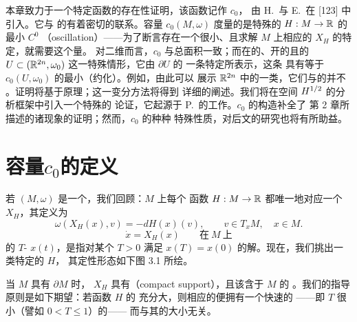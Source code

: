 
本章致力于一个特定\trCapacity{}函数的存在性证明，该函数记作 $c_{0}$，%
由 H.~\trHofer{}与 E.~\trZehnder{}在 [123] 中引入。它与\trHamiltonianSystem{}%
的\trPeriodicOrbit{}有着密切的联系。容量 $c_{0}(M,\omega)$ 度量的是特殊的%
\trHamiltonianFunction{} $H:M\to\mathbb{R}$ 的最小 $C^{0}$\textbf{\trOscillation}%
（oscillation）——为了断言存在一个\trPeriodic{}很小、且求解 $M$ 上相应的%
\trHamiltonianSystem{} $X_H$ 的特定\trPeriodicOrbit，就需要这个量。%
对二维\trManifold{}而言，$c_{0}$ 与总面积一致；而在\trConvex{}的、开的且\trSmooth{}的%
\trDomain{} $U\subset(\mathbb{R}^{2n},\omega_{0})$ 这一特殊情形，它由 $\partial U$ 的%
一条特定\trClosedCharacteristic{}所表示，这条\trClosedCharacteristic{}%
具有等于 $c_{0}(U,\omega_{0})$ 的最小（约化）\trAction。例如，由此可以%
展示 $\mathbb{R}^{2n}$ 中的一类\trCompact\trHypersurface，它们与\trConvex{}的\trHypersurface{}并不%
\trSymplectic\trDiffeomorphic。证明将基于\trAction{}原理；这一变分方法将得到%
详细的阐述。我们将在\trSobolev{}空间 $H^{1/2}$ 的分析框架中引入一个特殊的%
\trMinimax{}论证，它起源于 P.~\trRabinowitz{}的工作。$c_{0}$ 的构造补全了%
第 2 章所描述的诸\trSymplectic\trRigidity{}现象的证明；然而，$c_{0}$ 的种种%
特殊性质，对后文\trHamiltonianDynamics{}的研究也将有所助益。

\section{容量\texorpdfstring{$c_{0}$}{c0}的定义}
\label{sec:capacity-c0}

若 $(M,\omega)$ 是一个\trSymplecticManifold，我们回顾：$M$ 上每个\trSmooth{}%
函数 $H:M\to\mathbb{R}$ 都唯一地对应一个\trHamiltonianVectorField{} $X_H$，其定义为
\[
\omega(X_H(x),v)=-dH(x)(v),\qquad v\in T_{x}M,\quad x\in M.
\]
\trHamiltonianEquation
\[
\dot{x}=X_H(x)\qquad\text{在}\ M\ \text{上}
\]
的 $T$-\trPeriodicSolution{} $x(t)$，是指对某个 $T>0$ 满足\trBoundaryCondition{}%
$x(T)=x(0)$ 的解。现在，我们挑出一类特定的\trHamiltonianFunction{} $H$，%
其定性形态如下图 3.1 所绘。

当 $M$ 具有\trBoundary{} $\partial M$ 时，\trHamiltonianVectorField{} $X_H$%
具有\textbf{\trCompactSupport}（compact support），且该\trSupport{}含于 $M$ 的%
\trInterior。我们的指导原则是如下期望：若函数 $H$ 的\trOscillation{}%
充分大，则相应的\trHamiltonianVectorField{}便拥有一个快速的\trPeriodicSolution{}%
——即\trPeriodic{} $T$ 很小（譬如 $0<T\leq1$）的\trPeriodicSolution——%
而与其\trSupport{}的大小无关。

